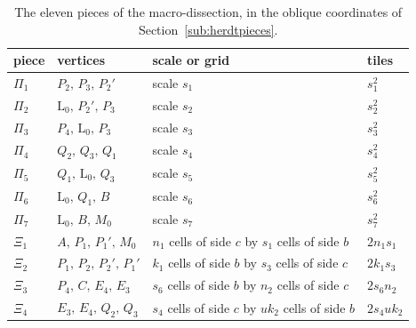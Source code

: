 \documentclass[11pt,reqno]{amsart}
\theoremstyle{plain}
\theoremstyle{definition}
\begin{document}
\begin{table}[ht]
\centering\small
\begin{tabular}{llll}
\hline
piece & vertices & scale or grid & tiles\\
\hline
$\Pi_1$ & $P_2,\,P_3,\,P_2'$ & scale $s_1$ & $s_1^2$\\
$\Pi_2$ & $\mathrm{L}_0,\,P_2',\,P_3$ & scale $s_2$ & $s_2^2$\\
$\Pi_3$ & $P_4,\,\mathrm{L}_0,\,P_3$ & scale $s_3$ & $s_3^2$\\
$\Pi_4$ & $Q_2,\,Q_3,\,Q_1$ & scale $s_4$ & $s_4^2$\\
$\Pi_5$ & $Q_1,\,\mathrm{L}_0,\,Q_3$ & scale $s_5$ & $s_5^2$\\
$\Pi_6$ & $\mathrm{L}_0,\,Q_1,\,B$ & scale $s_6$ & $s_6^2$\\
$\Pi_7$ & $\mathrm{L}_0,\,B,\,M_0$ & scale $s_7$ & $s_7^2$\\
$\Xi_1$ & $A,\,P_1,\,P_1',\,M_0$ & $n_1$ cells of side $c$ by $s_1$ cells of side $b$ & $2n_1s_1$\\
$\Xi_2$ & $P_1,\,P_2,\,P_2',\,P_1'$ & $k_1$ cells of side $b$ by $s_3$ cells of side $c$ & $2k_1s_3$\\
$\Xi_3$ & $P_4,\,C,\,E_4,\,E_3$ & $s_6$ cells of side $b$ by $n_2$ cells of side $c$ & $2s_6n_2$\\
$\Xi_4$ & $E_3,\,E_4,\,Q_2,\,Q_3$ & $s_4$ cells of side $c$ by $uk_2$ cells of side $b$ & $2s_4uk_2$\\
\hline
\end{tabular}
\caption{The eleven pieces of the macro-dissection, in the oblique coordinates of Section~\ref{sub:herdtpieces}.}\label{tab:herdt}
\end{table}
\end{document}
